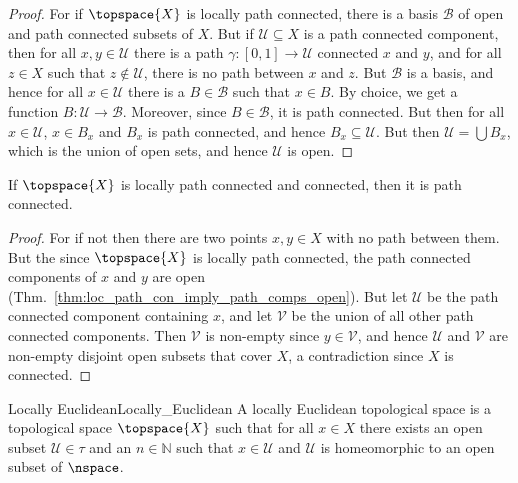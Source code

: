 \documentclass{article}                                                        %
\begin{document}
        \begin{proof}
            For if $\topspace{X}$ is locally path connected, there is a basis
            $\mathcal{B}$ of open and path connected subsets of $X$. But if
            $\mathcal{U}\subseteq{X}$ is a path connected component, then for
            all $x,y\in\mathcal{U}$ there is a path
            $\gamma:[0,1]\rightarrow\mathcal{U}$ connected $x$ and $y$, and for
            all $z\in{X}$ such that $z\notin\mathcal{U}$, there is no path
            between $x$ and $z$. But $\mathcal{B}$ is a basis, and hence for
            all $x\in\mathcal{U}$ there is a $B\in\mathcal{B}$ such that
            $x\in{B}$. By choice, we get a function
            $B:\mathcal{U}\rightarrow\mathcal{B}$. Moreover, since
            $B\in\mathcal{B}$, it is path connected. But then for all
            $x\in\mathcal{U}$, $x\in{B}_{x}$ and $B_{x}$ is path connected,
            and hence $B_{x}\subseteq\mathcal{U}$. But then
            $\mathcal{U}=\bigcup{B}_{x}$, which is the union of open sets, and
            hence $\mathcal{U}$ is open.
        \end{proof}
        \begin{theorem}
            \label{thm:Loc_Path_and_Con_Imply_Path_Con}
            If $\topspace{X}$ is locally path connected and connected, then it
            is path connected.
        \end{theorem}
        \begin{proof}
            For if not then there are two points $x,y\in{X}$ with no path
            between them. But the since $\topspace{X}$ is locally path
            connected, the path connected components of $x$ and $y$ are open
            (Thm.~\ref{thm:loc_path_con_imply_path_comps_open}). But let
            $\mathcal{U}$ be the path connected component containing $x$, and
            let $\mathcal{V}$ be the union of all other path connected
            components. Then $\mathcal{V}$ is non-empty since $y\in\mathcal{V}$,
            and hence $\mathcal{U}$ and $\mathcal{V}$ are non-empty disjoint
            open subsets that cover $X$, a contradiction since $X$ is connected.
        \end{proof}
        \begin{fdefinition}{Locally Euclidean}{Locally_Euclidean}
            A locally Euclidean topological space is a topological space
            $\topspace{X}$ such that for all $x\in{X}$ there exists an open
            subset $\mathcal{U}\in\tau$ and an $n\in\mathbb{N}$ such that
            $x\in\mathcal{U}$ and $\mathcal{U}$ is homeomorphic to an open
            subset of $\nspace$.
        \end{fdefinition}
\end{document}
